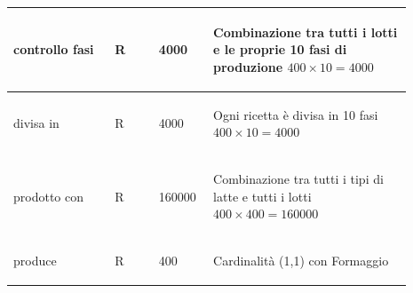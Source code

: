 \documentclass[12pt,a4paper]{article}
\begin{document}
\begin{center}
\begin{longtable}{|p{0.23\linewidth}|p{0.1\linewidth}|p{0.11\linewidth}|p{0.45\linewidth}|}
\hline
controllo fasi 				& \begin{center}
\vspace{-25pt}R
\end{center}
					& \begin{center}
					\vspace{-25pt}4000\end{center}
					& \begin{flushleft}\vspace{-25pt} Combinazione tra tutti i lotti e le proprie 10 fasi di produzione $400\times 10=4000$ \end{flushleft}\\ 

\hline
divisa in 				& \begin{center}
\vspace{-25pt}R
\end{center}
					& \begin{center}
					\vspace{-25pt}4000\end{center}
					& \begin{flushleft}\vspace{-25pt} Ogni ricetta è divisa in 10 fasi $400\times 10= 4000$\end{flushleft}\\ 

\hline
prodotto con 				& \begin{center}
\vspace{-25pt}R
\end{center}
					& \begin{center}
					\vspace{-25pt}160000\end{center}
					& \begin{flushleft}\vspace{-25pt} Combinazione tra tutti i tipi di latte e tutti i lotti $400\times 400 = 160000$\end{flushleft}\\ 

\hline
produce 				& \begin{center}
\vspace{-25pt}R
\end{center}
					& \begin{center}
					\vspace{-25pt}400\end{center}
					& \begin{flushleft}\vspace{-25pt} Cardinalità (1,1) con Formaggio \end{flushleft}\\ 


\end{longtable}
\end{center}
\end{document}
